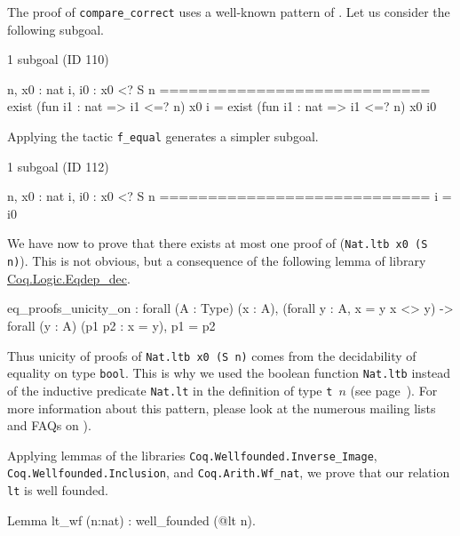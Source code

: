 \begin{remark}
 The proof of \texttt{compare\_correct} uses a well-known pattern of \coq{}.
Let us consider  the following subgoal.

\begin{Coqanswer}
 1 subgoal (ID 110)
  
  n, x0 : nat
  i, i0 : x0 <? S n
  ============================
  exist (fun i1 : nat => i1 <=? n) x0 i =
  exist (fun i1 : nat => i1 <=? n) x0 i0
\end{Coqanswer}

Applying the tactic \texttt{f\_equal} generates a simpler subgoal.

\begin{Coqanswer}
1 subgoal (ID 112)
  
  n, x0 : nat
  i, i0 : x0 <? S n
  ============================
  i = i0
\end{Coqanswer}

We have now to prove that there exists at most one  proof of (\texttt{Nat.ltb x0 (S n)}). This is not obvious, but  a consequence of the following lemma of library 
\href{https://coq.inria.fr/distrib/current/stdlib/Coq.Logic.Eqdep_dec.html}{Coq.Logic.Eqdep\_dec}.

\label{sect:eq-proof-unicity}

\begin{Coqanswer}
eq_proofs_unicity_on :
forall (A : Type) (x : A),
(forall y : A, x = y \/ x <> y) -> 
forall (y : A) (p1 p2 : x = y), p1 = p2
\end{Coqanswer}

Thus unicity of proofs of \texttt{Nat.ltb x0 (S n)}  comes from the decidability of
equality on type \texttt{bool}.
This is why we used the boolean function \texttt{Nat.ltb} instead of the inductive predicate \texttt{Nat.lt} in the definition of type \texttt{t $n$} (see page~\pageref{def: Finite-ord-type}).
For more information about this pattern, please look at the numerous mailing lists and 
FAQs on \coq{}).



\end{remark}


Applying lemmas of the libraries \texttt{Coq.Wellfounded.Inverse\_Image}, \linebreak
 \texttt{Coq.Wellfounded.Inclusion}, and \texttt{Coq.Arith.Wf\_nat}, we prove that our
relation \texttt{lt} is well founded.

\begin{Coqsrc}
Lemma lt_wf (n:nat) : well_founded (@lt n).
\end{Coqsrc}

